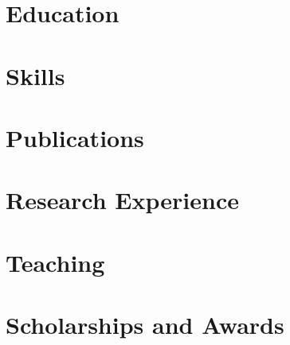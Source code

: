 \documentclass[14pt]{prometheus_cv}
\begin{document}
\thispagestyle{empty}					%
\pagestyle{fancy}			 		%

\vspace*{-1cm}
\centering 


\vspace*{0.4cm}
\section{Education}


\section{Skills}


\section{Publications}


\section{Research Experience}


\section{Teaching}


\section{Scholarships and Awards}

\end{document}
